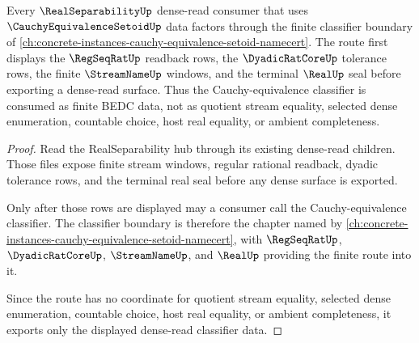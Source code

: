 \begin{theorem}
\label{thm:real-separability-forward-cauchy-equivalence-route}
Every $\RealSeparabilityUp$ dense-read consumer that uses $\CauchyEquivalenceSetoidUp$ data factors through the finite classifier boundary of \autoref{ch:concrete-instances-cauchy-equivalence-setoid-namecert}. The route first displays the $\RegSeqRatUp$ readback rows, the $\DyadicRatCoreUp$ tolerance rows, the finite $\StreamNameUp$ windows, and the terminal $\RealUp$ seal before exporting a dense-read surface. Thus the Cauchy-equivalence classifier is consumed as finite BEDC data, not as quotient stream equality, selected dense enumeration, countable choice, host real equality, or ambient completeness.
\end{theorem}
\begin{proof}
Read the RealSeparability hub through its existing dense-read children. Those files expose finite stream windows, regular rational readback, dyadic tolerance rows, and the terminal real seal before any dense surface is exported.

Only after those rows are displayed may a consumer call the Cauchy-equivalence classifier. The classifier boundary is therefore the chapter named by \autoref{ch:concrete-instances-cauchy-equivalence-setoid-namecert}, with $\RegSeqRatUp$, $\DyadicRatCoreUp$, $\StreamNameUp$, and $\RealUp$ providing the finite route into it.

Since the route has no coordinate for quotient stream equality, selected dense enumeration, countable choice, host real equality, or ambient completeness, it exports only the displayed dense-read classifier data.
\end{proof}
